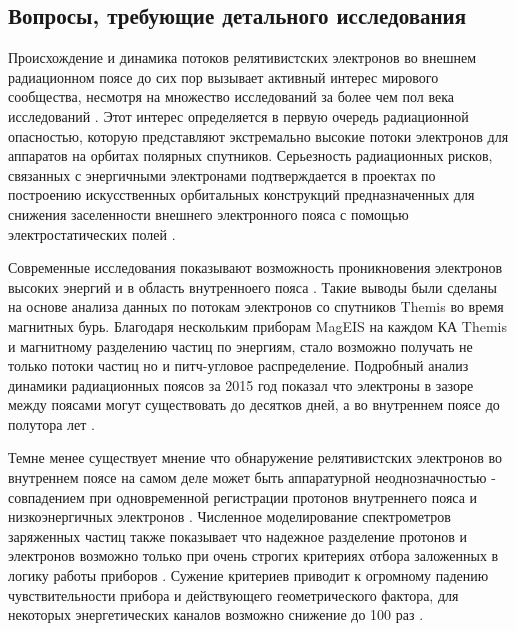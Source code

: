 \subsection{Вопросы, требующие детального исследования}
Происхождение и динамика потоков релятивистских электронов во внешнем радиационном поясе до сих пор вызывает активный интерес мирового сообщества, несмотря на множество исследований  за более чем пол века исследований \cite{Gussenhoven1997,Borovsky2010,Holeman1991,Miyoshi2011,Chen2016,Turner2013,Brautigam2001,Borovsky2010a,Gussenhoven1995,Borovsky2011,Baker2013,Mullen1998,Chen2014,Morley2010,Potapov2014,Denton2010}. Этот интерес определяется в первую очередь радиационной опасностью, которую представляют экстремально высокие потоки электронов для аппаратов на орбитах полярных спутников. Серьезность радиационных рисков, связанных с энергичными электронами подтверждается в проектах по построению искусственных орбитальных конструкций предназначенных для снижения заселенности внешнего электронного пояса с помощью электростатических полей \cite{Hoyt2007}.

Современные исследования показывают возможность проникновения электронов высоких энергий и в область внутренноего пояса \cite{Claudepierre2017}. Такие выводы были сделаны на основе анализа данных по потокам электронов со спутников Themis во время магнитных бурь. Благодаря нескольким приборам MagEIS  на каждом КА Themis и магнитному разделению частиц по энергиям, стало возможно получать не только потоки частиц но и питч-угловое распределение. Подробный анализ динамики радиационных поясов за 2015 год показал что электроны в зазоре между поясами могут существовать до десятков дней, а во внутреннем поясе до полутора лет \cite{Claudepierre2017}. 

Темне менее существует мнение что обнаружение релятивистских  электронов во внутреннем поясе на самом деле может быть аппаратурной неоднозначностью - совпадением при одновременной регистрации  протонов внутреннего пояса и низкоэнергичных электронов \cite{Selesnick2015}. Численное моделирование спектрометров заряженных частиц также показывает что надежное разделение протонов и электронов возможно только при очень строгих критериях отбора заложенных в логику работы приборов \cite{zolotarev2017numerical51590279}. Сужение критериев  приводит к огромному падению чувствительности прибора и действующего геометрического фактора, для некоторых энергетических каналов возможно снижение до 100 раз \cite{zolotarev2017numerical51590279}.
 
